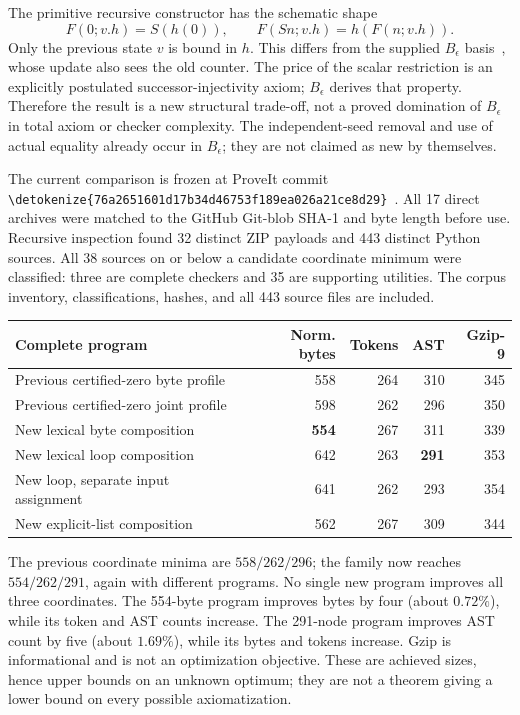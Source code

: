 \documentclass[11pt,letterpaper]{article}
\theoremstyle{definition}\newtheorem{definition}[theorem]{Definition}
\theoremstyle{remark}\newtheorem{remark}[theorem]{Remark}
\newcommand{\file}[1]{\expandafter\nolinkurl\expandafter{\detokenize{#1}}}
\begin{document}
The primitive recursive constructor has the schematic shape
\[
\boxed{\quad F(0;v.h)=S(h(0)),\qquad F(Sn;v.h)=h(F(n;v.h)).\quad}
\]
Only the previous state $v$ is bound in $h$. This differs from the
supplied $B_\epsilon$ basis~\cite{bounded}, whose update also sees the old
counter. The price of the scalar restriction is an explicitly postulated
successor-injectivity axiom; $B_\epsilon$ derives that property. Therefore
the result is a new structural trade-off, not a proved domination of
$B_\epsilon$ in total axiom or checker complexity. The independent-seed
removal and use of actual equality already occur in $B_\epsilon$;
they are not claimed as new by themselves.

The current comparison is frozen at ProveIt commit
\file{76a2651601d17b34d46753f189ea026a21ce8d29}~\cite{corpus}.
All 17 direct archives were matched to the GitHub Git-blob SHA-1 and
byte length before use. Recursive inspection found 32 distinct ZIP
payloads and 443 distinct Python sources. All 38 sources on or below a
candidate coordinate minimum were classified: three are complete
checkers and 35 are supporting utilities. The corpus inventory,
classifications, hashes, and all 443 source files are included.

\begin{center}\small
\begin{tabular}{@{}lrrrr@{}}
\toprule
Complete program & Norm. bytes & Tokens & AST & Gzip-9\\
\midrule
Previous certified-zero byte profile & 558 & 264 & 310 & 345\\
Previous certified-zero joint profile & 598 & 262 & 296 & 350\\
New lexical byte composition & \textbf{554} & 267 & 311 & 339\\
New lexical loop composition & 642 & 263 & \textbf{291} & 353\\
New loop, separate input assignment & 641 & 262 & 293 & 354\\
New explicit-list composition & 562 & 267 & 309 & 344\\
\bottomrule
\end{tabular}
\end{center}
The previous coordinate minima are $558/262/296$; the family now
reaches $554/262/291$, again with different programs. No single new
program improves all three coordinates. The 554-byte program improves
bytes by four (about $0.72\%$), while its token and AST counts increase.
The 291-node program improves AST count by five (about $1.69\%$), while
its bytes and tokens increase. Gzip is informational and is not an
optimization objective. These are achieved sizes, hence upper bounds on
an unknown optimum; they are not a theorem giving a lower bound on
every possible axiomatization.
\end{document}
